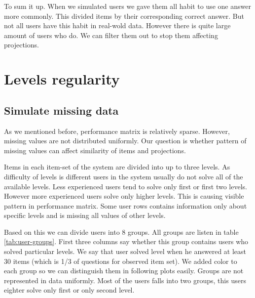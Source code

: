 \documentclass[
  digital, %
  table,   %
  nolof,     %
  nolot,     %
  nocover
]{fithesis3}
\begin{document}


To sum it up. When we simulated users we gave them all habit to use one answer more
commonly. This divided items by their corresponding correct answer. But not all users have this habit in real-wold data. However
there is quite large amount of users who do. We can filter them out to stop them affecting projections.


\section{Levels regularity}


\subsection{Simulate missing data}




As we mentioned before, performance matrix is relatively sparse. However, missing values are not distributed uniformly. Our question is whether pattern of missing values can affect similarity of items and projections.


Items in each item-set of the system are divided into up to three levels. As difficulty of levels is different users in the system usually do not solve all of the available levels. Less experienced users tend to solve only first or first two levels. However more experienced users solve only higher levels. This is causing visible pattern in performance matrix. Some user rows contains information only about specific levels and is missing all values of other levels.


Based on this we can divide users into 8 groups. All groups are listen in table \ref{tab:user-groups}. First three columns say whether this group contains users who solved particular levels. We say that user solved level when he answered at least 30 items (which is 1/3 of questions for observed item set). We added color to each group so we can distinguish them in following plots easily. Groups are not represented in data uniformly. Most of the users falls into two groups, this users eighter solve only first or only second level.
\end{document}
